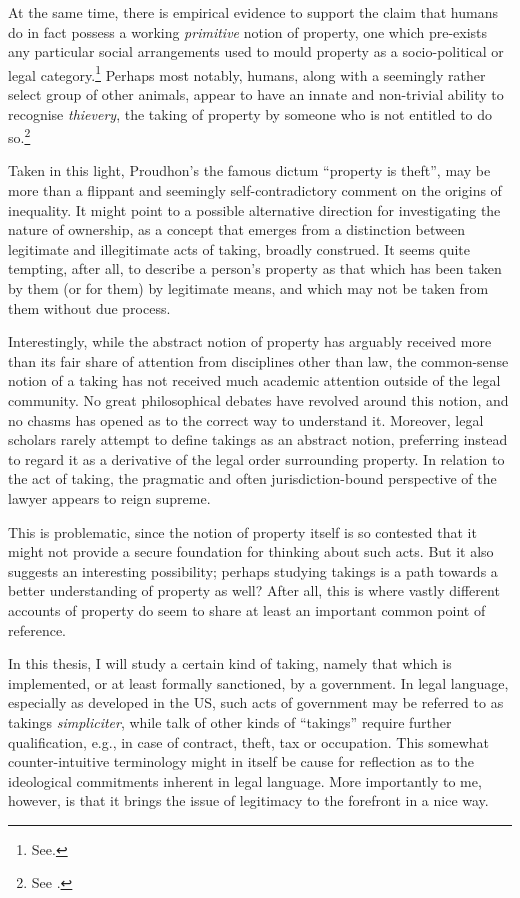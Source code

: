 \documentclass{article} %
\begin{document}
At the same time, there is empirical evidence to support the claim that humans do in fact possess a working {\it primitive} notion of property, one which pre-exists any particular social arrangements used to mould property as a socio-political or legal category.\footnote{See\cite{stake06}.} Perhaps most notably, humans, along with a seemingly rather select group of other animals, appear to have an innate and non-trivial ability to recognise {\it thievery}, the taking of property by someone who is not entitled to do so.\footnote{See \cite[11-13]{brosnan11}.}

Taken in this light, Proudhon's the famous dictum ``property is theft'', may be more than a flippant and seemingly self-contradictory comment on the origins of inequality. It might point to a possible alternative direction for investigating the nature of ownership, as a concept that emerges from a distinction between legitimate and illegitimate acts of taking, broadly construed. It seems quite tempting, after all, to describe a person's property as that which has been taken by them (or for them) by legitimate means, and which may not be taken from them without due process.

Interestingly, while the abstract notion of property has arguably received more than its fair share of attention from disciplines other than law, the common-sense notion of a taking has not received much academic attention outside of the legal community. No great philosophical debates have revolved around this notion, and no chasms has opened as to the correct way to understand it. Moreover, legal scholars rarely attempt to define takings as an abstract notion, preferring instead to regard it as a derivative of the legal order surrounding property. In relation to the act of taking, the pragmatic and often jurisdiction-bound perspective of the lawyer appears to reign supreme.

This is problematic, since the notion of property itself is so contested that it might not provide a secure foundation for thinking about such acts. But it also suggests an interesting possibility; perhaps studying takings is a path towards a better understanding of property as well? After all, this is where vastly different accounts of property do seem to share at least an important common point of reference.

In this thesis, I will study a certain kind of taking, namely that which is implemented, or at least formally sanctioned, by a government. In legal language, especially as developed in the US, such acts of government may be referred to as takings {\it simpliciter}, while talk of other kinds of ``takings'' require further qualification, e.g., in case of contract, theft, tax or occupation. This somewhat counter-intuitive terminology might in itself be cause for reflection as to the ideological commitments inherent in legal language. More importantly to me, however, is that it brings the issue of legitimacy to the forefront in a nice way.
\end{document}
